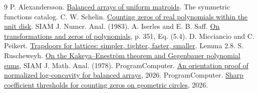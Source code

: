 \documentclass[11pt]{article}
\begin{document}
\small
\begin{thebibliography}{9}
 P. Alexandersson. \href{https://www.symmetricfunctions.com/realRootedOpenProblems.htm\#conjBalancedArrays}{Balanced arrays of uniform matroids}. The symmetric functions catalog.
 C. W. Schelin. \href{https://doi.org/10.1137/0720072}{Counting zeros of real polynomials within the unit disk}. SIAM J. Numer. Anal. (1983).
 A. Iserles and E. B. Saff. \href{https://doi.org/10.1216/rmjm/1181073012}{On transformations and zeros of polynomials}, p. 351, Eq. (5.4).
 D. Micciancio and C. Peikert. \href{https://web.eecs.umich.edu/~cpeikert/pubs/efftrap.pdf}{Trapdoors for lattices: simpler, tighter, faster, smaller}. Lemma 2.8.
 S. Ruscheweyh. \href{https://doi.org/10.1137/0509049}{On the Kakeya--Enestr\"om theorem and Gegenbauer polynomial sums}, SIAM J. Math. Anal. (1978).
 ProgramComputer. \href{https://github.com/ProgramComputer/open-math-research/blob/5ce46103459332036ee2cf01b67e8567b9034c33/topics/balanced-arrays/orientation-normalization.md}{An orientation proof of normalized log-concavity for balanced arrays}, 2026.
 ProgramComputer. \href{https://github.com/ProgramComputer/open-math-research/pull/175}{Sharp coefficient thresholds for counting zeros on geometric circles}, 2026.
\end{thebibliography}
\end{document}
